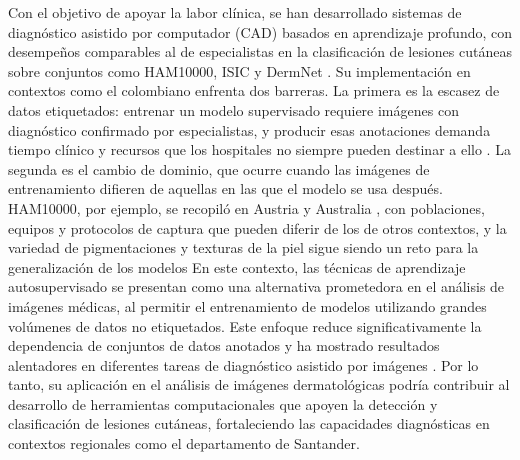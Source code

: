 Con el objetivo de apoyar la labor clínica, se han desarrollado sistemas de diagnóstico asistido por computador (CAD) basados en aprendizaje profundo, con desempeños comparables al de especialistas en la clasificación de lesiones cutáneas sobre conjuntos como HAM10000, ISIC y DermNet \parencite{omiye2025reflectanceconfocal,tschandl2018ham10000}. Su implementación en contextos como el colombiano enfrenta dos barreras. La primera es la escasez de datos etiquetados: entrenar un modelo supervisado requiere imágenes con diagnóstico confirmado por especialistas, y producir esas anotaciones demanda tiempo clínico y recursos que los hospitales no siempre pueden destinar a ello \parencite{wang2023pymic}. La segunda es el cambio de dominio, que ocurre cuando las imágenes de entrenamiento difieren de aquellas en las que el modelo se usa después. HAM10000, por ejemplo, se recopiló en Austria y Australia \parencite{tschandl2018ham10000}, con poblaciones, equipos y protocolos de captura que pueden diferir de los de otros contextos, y la variedad de pigmentaciones y texturas de la piel sigue siendo un reto para la generalización de los modelos
En este contexto, las técnicas de aprendizaje autosupervisado se presentan como una alternativa prometedora en el análisis de imágenes médicas, al permitir el entrenamiento de modelos utilizando grandes volúmenes de datos no etiquetados. Este enfoque reduce significativamente la dependencia de conjuntos de datos anotados y ha mostrado resultados alentadores en diferentes tareas de diagnóstico asistido por imágenes \parencite{krishnan2022selfsupervisedmedicine}. Por lo tanto, su aplicación en el análisis de imágenes dermatológicas podría contribuir al desarrollo de herramientas computacionales que apoyen la detección y clasificación de lesiones cutáneas, fortaleciendo las capacidades diagnósticas en contextos regionales como el departamento de Santander.


